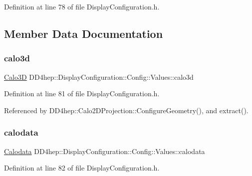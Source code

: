 Definition at line 78 of file Display\+Configuration.\+h.



\subsection{Member Data Documentation}
\hypertarget{union_d_d4hep_1_1_display_configuration_1_1_config_1_1_values_adbed006d75dc86cab0e4774c82e4be48}{}\label{union_d_d4hep_1_1_display_configuration_1_1_config_1_1_values_adbed006d75dc86cab0e4774c82e4be48} 
\subsubsection{\texorpdfstring{calo3d}{calo3d}}
{\footnotesize\ttfamily \hyperlink{struct_d_d4hep_1_1_display_configuration_1_1_calo3_d}{Calo3D} D\+D4hep\+::\+Display\+Configuration\+::\+Config\+::\+Values\+::calo3d}



Definition at line 81 of file Display\+Configuration.\+h.



Referenced by D\+D4hep\+::\+Calo2\+D\+Projection\+::\+Configure\+Geometry(), and extract().

\hypertarget{union_d_d4hep_1_1_display_configuration_1_1_config_1_1_values_ad20f453699ee7904ed8b510fa714b184}{}\label{union_d_d4hep_1_1_display_configuration_1_1_config_1_1_values_ad20f453699ee7904ed8b510fa714b184} 
\subsubsection{\texorpdfstring{calodata}{calodata}}
{\footnotesize\ttfamily \hyperlink{struct_d_d4hep_1_1_display_configuration_1_1_calodata}{Calodata} D\+D4hep\+::\+Display\+Configuration\+::\+Config\+::\+Values\+::calodata}



Definition at line 82 of file Display\+Configuration.\+h.




